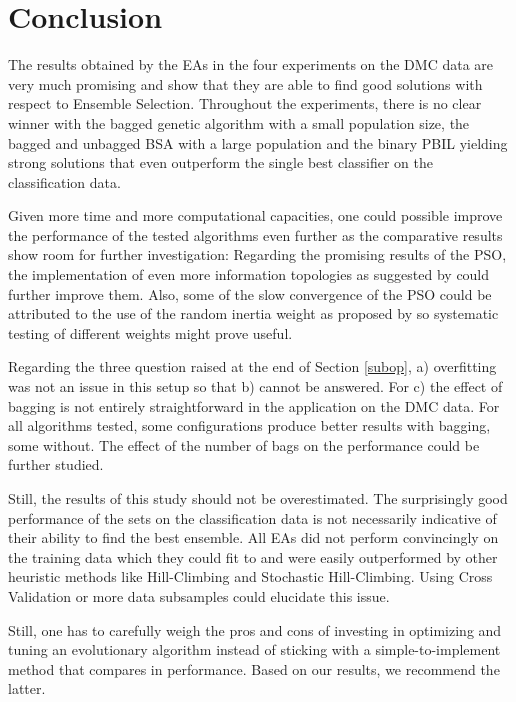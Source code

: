 \section{Conclusion}
\label{conc}
The results obtained by the EAs in the four experiments on the DMC data are very much promising and show that they are able to find good solutions with respect to Ensemble Selection. Throughout the experiments, there is no clear winner with the bagged genetic algorithm with a small population size, the bagged and unbagged BSA with a large population and the binary PBIL yielding strong solutions that even outperform the single best classifier on the classification data. 

Given more time and more computational capacities, one could possible improve the performance of the tested algorithms even further as the comparative results show room for further investigation: 
Regarding the promising results of the PSO, the implementation of even more information topologies as suggested by \cite{kennedymendes} could further improve them. Also, some of the slow convergence of the PSO could be attributed to the use of the random inertia weight as proposed by \cite{bansal2011inertia} so systematic testing of different weights might prove useful. 

Regarding the three question raised at the end of Section \ref{subop}, a) overfitting was not an issue in this setup so that b) cannot be answered. For c) the effect of bagging is not entirely straightforward in the application on the DMC data. For all algorithms tested, some configurations produce better results with bagging, some without. The effect of the number of bags on the performance could be further studied.

Still, the results of this study should not be overestimated. The surprisingly good performance of the sets on the classification data is not necessarily indicative of their ability to find the best ensemble. All EAs did not perform convincingly on the training data which they could fit to and were easily outperformed by other heuristic methods like Hill-Climbing and Stochastic Hill-Climbing. Using Cross Validation or more data subsamples could elucidate this issue.

Still, one has to carefully weigh the pros and cons of investing in optimizing and tuning an evolutionary algorithm instead of sticking with a simple-to-implement method that compares in performance. Based on our results, we recommend the latter.